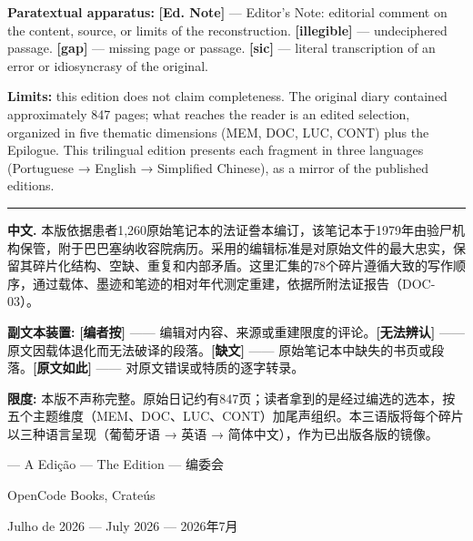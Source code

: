 \vspace{0.4em}
\noindent\textbf{Paratextual apparatus:} \textbf{[Ed. Note]} --- Editor's Note: editorial comment on the content, source, or limits of the reconstruction. \textbf{[illegible]} --- undeciphered passage. \textbf{[gap]} --- missing page or passage. \textbf{[sic]} --- literal transcription of an error or idiosyncrasy of the original.

\vspace{0.4em}
\noindent\textbf{Limits:} this edition does not claim completeness. The original diary contained approximately 847 pages; what reaches the reader is an edited selection, organized in five thematic dimensions (MEM, DOC, LUC, CONT) plus the Epilogue. This trilingual edition presents each fragment in three languages (Portuguese → English → Simplified Chinese), as a mirror of the published editions.

\vspace{1em}
\noindent\rule{\textwidth}{0.5pt}
\vspace{0.8em}

\noindent\textbf{中文.} 本版依据患者1,260原始笔记本的法证誊本编订，该笔记本于1979年由验尸机构保管，附于巴巴塞纳收容院病历。采用的编辑标准是对原始文件的最大忠实，保留其碎片化结构、空缺、重复和内部矛盾。这里汇集的78个碎片遵循大致的写作顺序，通过载体、墨迹和笔迹的相对年代测定重建，依据所附法证报告（DOC-03）。

\vspace{0.4em}
\noindent\textbf{副文本装置:} \textbf{[编者按]} —— 编辑对内容、来源或重建限度的评论。\textbf{[无法辨认]} —— 原文因载体退化而无法破译的段落。\textbf{[缺文]} —— 原始笔记本中缺失的书页或段落。\textbf{[原文如此]} —— 对原文错误或特质的逐字转录。

\vspace{0.4em}
\noindent\textbf{限度:} 本版不声称完整。原始日记约有847页；读者拿到的是经过编选的选本，按五个主题维度（MEM、DOC、LUC、CONT）加尾声组织。本三语版将每个碎片以三种语言呈现（葡萄牙语 → 英语 → 简体中文），作为已出版各版的镜像。

\vspace{1.2em}

\begin{flushright}
--- A Edição --- The Edition --- 编委会\par
OpenCode Books, Crateús\par
Julho de 2026 --- July 2026 --- 2026年7月
\end{flushright}

\endgroup
\clearpage
